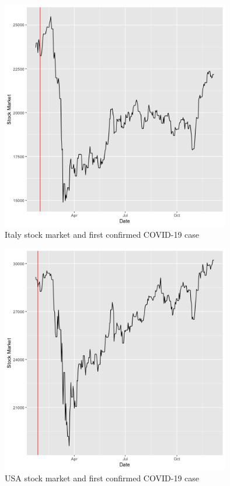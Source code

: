 \documentclass[11pt]{article}
\begin{document}
\begin{figure}[!h]
\centering
  \includegraphics[width=100mm]{R-Code/plots/italyFinance.png}  
  \caption{Italy stock market and first confirmed COVID-19 case}
  \label{italy-covid-market}
\end{figure}

\begin{figure}[!h]
\centering
  \includegraphics[width=100mm]{R-Code/plots/usaFinance.png} 
    \caption{USA stock market and first confirmed COVID-19 case}
    \label{usa-covid-market}
\end{figure}
\end{document}
